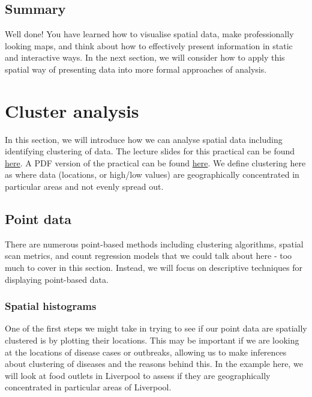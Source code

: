 \documentclass[
]{book}
\begin{document}
\hypertarget{summary}{%
\section{Summary}\label{summary}}

Well done! You have learned how to visualise spatial data, make professionally looking maps, and think about how to effectively present information in static and interactive ways. In the next section, we will consider how to apply this spatial way of presenting data into more formal approaches of analysis.

\hypertarget{cluster}{%
\chapter{Cluster analysis}\label{cluster}}

In this section, we will introduce how we can analyse spatial data including identifying clustering of data. The lecture slides for this practical can be found \href{}{here}. A PDF version of the practical can be found \href{}{here}. We define clustering here as where data (locations, or high/low values) are geographically concentrated in particular areas and not evenly spread out.

\hypertarget{point-data}{%
\section{Point data}\label{point-data}}

There are numerous point-based methods including clustering algorithms, spatial scan metrics, and count regression models that we could talk about here - too much to cover in this section. Instead, we will focus on descriptive techniques for displaying point-based data.

\hypertarget{spatial-histograms}{%
\subsection{Spatial histograms}\label{spatial-histograms}}

One of the first steps we might take in trying to see if our point data are spatially clustered is by plotting their locations. This may be important if we are looking at the locations of disease cases or outbreaks, allowing us to make inferences about clustering of diseases and the reasons behind this. In the example here, we will look at food outlets in Liverpool to assess if they are geographically concentrated in particular areas of Liverpool.
\end{document}
